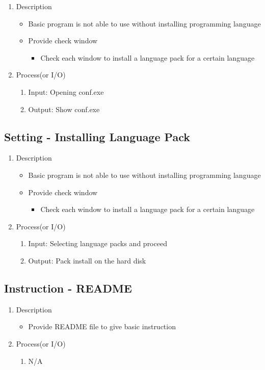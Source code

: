 \documentclass[conference]{IEEEtran}
\begin{document}
\begin{enumerate}
  \item Description
  \begin{itemize}
    \item Basic program is not able to use without installing programming language
    \item Provide check window
    \begin{itemize} 
      \item Check each window to install a language pack for a certain language 
    \end{itemize}
  \end{itemize}
  \item Process(or I/O)
  \begin{enumerate}
    \item Input: Opening conf.exe
    \item Output: Show conf.exe
  \end{enumerate}
\end{enumerate}

\textit{}

\subsection{Setting - Installing Language Pack}
\begin{enumerate}
  \item Description
  \begin{itemize}
    \item Basic program is not able to use without installing programming language
    \item Provide check window
    \begin{itemize}
      \item Check each window to install a language pack for a certain language 
    \end{itemize}
  \end{itemize}
  \item Process(or I/O)
  \begin{enumerate}
    \item Input: Selecting language packs and proceed 
    \item Output: Pack install on the hard disk
  \end{enumerate}
\end{enumerate}


\textit{}
\subsection{Instruction - README}
\begin{enumerate}
  \item Description
  \begin{itemize}
    \item Provide README file to give basic instruction
  \end{itemize}
  \item Process(or I/O)
  \begin{enumerate}
    \item N/A
  \end{enumerate}
\end{enumerate}
\end{document}
